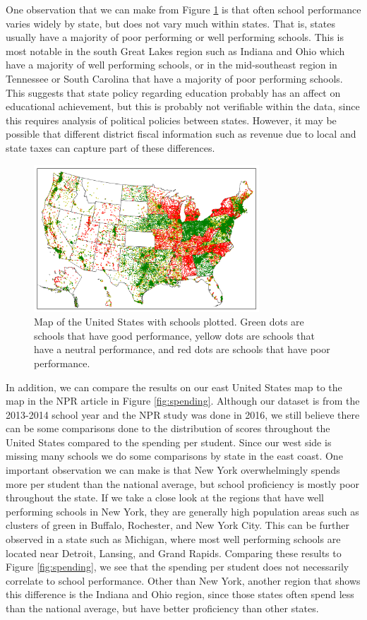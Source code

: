 One observation that we can make from Figure \ref{fig:us} is that often school performance varies widely by state, but does not vary much within states. That is, states usually have a majority of poor performing or well performing schools. This is most notable in the south Great Lakes region such as Indiana and Ohio which have a majority of well performing schools, or in the mid-southeast region in Tennessee or South Carolina that have a majority of poor performing schools. This suggests that state policy regarding education probably has an affect on educational achievement, but this is probably not verifiable within the data, since this requires analysis of political policies between states. However, it may be possible that different district fiscal information such as revenue due to local and state taxes can capture part of these differences.

\begin{figure} 
	\includegraphics[width=8.45cm]{images/avg_us.png}
	\caption{Map of the United States with schools plotted. Green dots are schools that have good performance, yellow dots are schools that have a neutral performance, and red dots are schools that have poor performance.}
	\label{fig:us}
\end{figure}

In addition, we can compare the results on our east United States map to the map in the NPR article \cite{npr2016} in Figure \ref{fig:spending}. Although our dataset is from the 2013-2014 school year and the NPR study was done in 2016, we still believe there can be some comparisons done to the distribution of scores throughout the United States compared to the spending per student. Since our west side is missing many schools we do some comparisons by state in the east coast. One important observation we can make is that New York overwhelmingly spends more per student than the national average, but school proficiency is mostly poor throughout the state. If we take a close look at the regions that have well performing schools in New York, they are generally high population areas such as clusters of green in Buffalo, Rochester, and New York City. This can be further observed in a state such as Michigan, where most well performing schools are located near Detroit, Lansing, and Grand Rapids. Comparing these results to Figure \ref{fig:spending}, we see that the spending per student does not necessarily correlate to school performance. Other than New York, another region that shows this difference is the Indiana and Ohio region, since those states often spend less than the national average, but have better proficiency than other states.

